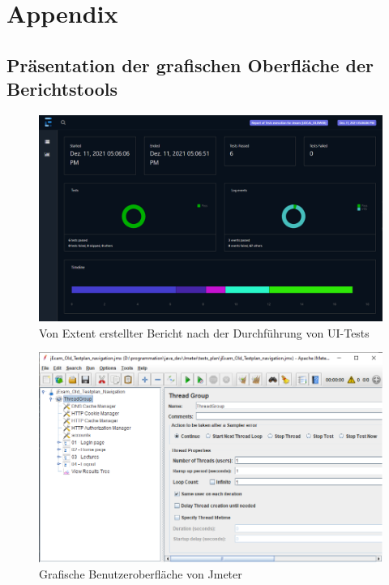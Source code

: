 \chapter{Appendix}

\section{Präsentation der grafischen Oberfläche der Berichtstools}

\begin{figure}[H]
    \centering
    \includegraphics[scale=0.4]{images/extentReport2}
    \caption{Von Extent erstellter Bericht nach der Durchführung von UI-Tests} \label{fig:extent-report}
\end{figure}


\begin{figure}[H]
    \centering
    \includegraphics[scale=0.6]{images/jmeter-ui}
    \caption{Grafische Benutzeroberfläche von Jmeter} \label{fig:jmeter}
\end{figure}

